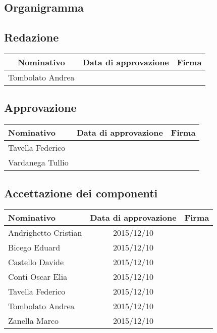 \documentclass[../PianoProgetto.tex]{subfiles}
\begin{document}
\begin{appendices}
\section{Organigramma}
	\subsection{Redazione}
		\begin{table}[h]
		\centering
	
		\begin{tabular}{ccc}
			\toprule
			Nominativo & Data di approvazione & Firma \\
			\midrule
			Tombolato Andrea &  &  \\
			\bottomrule
		\end{tabular}
		
	\end{table}	
	
	\subsection{Approvazione}
	
		\begin{table}[h]
		\centering
	
		\begin{tabular}{lcc}
			\toprule
			Nominativo & Data di approvazione & Firma \\
			\midrule
			Tavella Federico &  &  \\
			\midrule
			Vardanega Tullio &  &  \\
			\bottomrule
		\end{tabular}
		
	\end{table}		
	
	\subsection{Accettazione dei componenti}
	
		\begin{table}[h]
		\centering
	
		\begin{tabular}{lcc}
			\toprule
			Nominativo & Data di approvazione & Firma \\
			\midrule
			Andrighetto Cristian & 2015/12/10 &	 \\
			\midrule
			Bicego Eduard& 2015/12/10 &	 \\
			\midrule
			Castello Davide	& 2015/12/10 &	 \\
			\midrule
			Conti Oscar Elia & 2015/12/10 &	 \\
			\midrule
			Tavella Federico & 2015/12/10 &	 \\
			\midrule
			Tombolato Andrea & 2015/12/10 &	 \\
			\midrule
			Zanella Marco & 2015/12/10 &	 \\
			\bottomrule
		\end{tabular}
		

\end{table}
\end{appendices}
\end{document}
